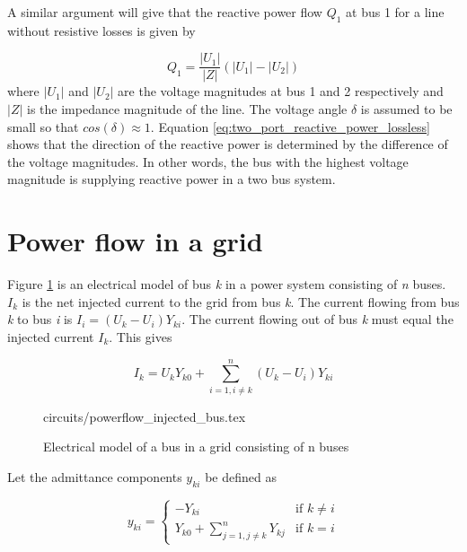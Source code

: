 \documentclass[class=book, crop=false]{standalone}
\begin{document}
A similar argument will give that the reactive power flow $Q_{1}$ at bus 1 for a line without resistive losses is given by 

\begin{equation}\label{eq:two_port_reactive_power_lossless}
Q_{1} =  \frac{|U_{1}|}{|Z|}(|U_{1}| - |U_{2}|)
\end{equation}
where $|U_{1}|$ and $|U_{2}|$ are the voltage magnitudes at bus 1 and 2 respectively and $|Z|$ is the impedance magnitude of the line. The voltage angle $\delta$ is assumed to be small so that $cos(\delta) \approx 1$. Equation \eqref{eq:two_port_reactive_power_lossless} shows that the direction of the reactive power is determined by the difference of the voltage magnitudes. In other words, the bus with the highest voltage magnitude is supplying reactive power in a two bus system.

\section{Power flow in a grid}
Figure \ref{fig:theory:powerflow_injected_bus} is an electrical model of bus \textit{k} in a power system consisting of \textit{n} buses. $I_{k}$ is the net injected current to the grid from bus \textit{k}\cite{opf_intro}. The current flowing from bus \textit{k} to bus \textit{i} is $I_{i} = (U_{k} - U_{i})Y_{ki}$. The current flowing out of bus \textit{k} must equal the injected current $I_{k}$. This gives

\begin{equation}\label{eq:powerflow_currentsum}
I_{k} =  U_{k}Y_{k0}
+ \sum_{i=1,i\neq k}^{n}(U_{k} - U_{i})Y_{ki}
\end{equation}



\begin{figure}[ht!]
    \center
    {circuits/powerflow_injected_bus.tex}
    \caption[size = 9]{Electrical model of a bus in a grid consisting of n buses}
    \label{fig:theory:powerflow_injected_bus}
\end{figure}

Let the admittance components $y_{ki}$ be defined as


\begin{equation}
\label{eq:theory:admittance_components}
    y_{ki} =
\left\{
	\begin{array}{ll}
		     -Y_{ki}  & 
	    \mbox{if }
	        k \neq i
	           \\
		Y_{k0} + \sum_{j=1,j\neq k}^{n} Y_{kj} & \mbox{if } k=i
	\end{array}
\right.
\end{equation}
\end{document}

